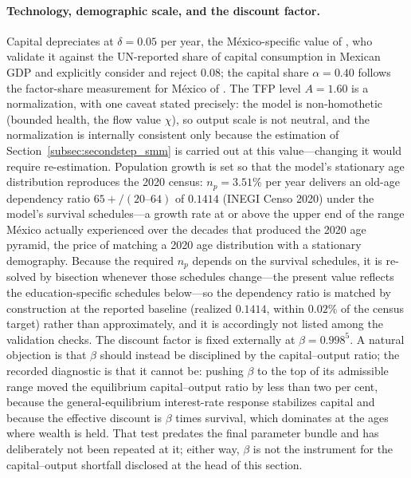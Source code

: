 \documentclass[12pt,a4paper]{article}
\begin{document}
\paragraph{Technology, demographic scale, and the discount factor.}
Capital depreciates at $\delta=0.05$ per year, the M\'exico-specific value of \citet{BergoeingKehoeKehoeSoto2002}, who validate it against the UN-reported share of capital consumption in Mexican GDP and explicitly consider and reject $0.08$; the capital share $\alpha=0.40$ follows the factor-share measurement for M\'exico of \citet{GarciaVerdu2005}. The TFP level $A=1.60$ is a normalization, with one caveat stated precisely: the model is non-homothetic (bounded health, the flow value $\chi$), so output scale is not neutral, and the normalization is internally consistent only because the estimation of Section~\ref{subsec:secondstep_smm} is carried out at this value---changing it would require re-estimation. Population growth is set so that the model's stationary age distribution reproduces the 2020 census: $n_p=3.51\%$ per year delivers an old-age dependency ratio $65{+}/(20\text{--}64)$ of $0.1414$ (INEGI Censo 2020) under the model's survival schedules---a growth rate at or above the upper end of the range M\'exico actually experienced over the decades that produced the 2020 age pyramid, the price of matching a 2020 age distribution with a stationary demography. Because the required $n_p$ depends on the survival schedules, it is re-solved by bisection whenever those schedules change---the present value reflects the education-specific schedules below---so the dependency ratio is matched by construction at the reported baseline (realized $0.1414$, within $0.02\%$ of the census target) rather than approximately, and it is accordingly not listed among the validation checks. The discount factor is fixed externally at $\beta=0.998^5$. A natural objection is that $\beta$ should instead be disciplined by the capital--output ratio; the recorded diagnostic is that it cannot be: pushing $\beta$ to the top of its admissible range moved the equilibrium capital--output ratio by less than two per cent, because the general-equilibrium interest-rate response stabilizes capital and because the effective discount is $\beta$ times survival, which dominates at the ages where wealth is held. That test predates the final parameter bundle and has deliberately not been repeated at it; either way, $\beta$ is not the instrument for the capital--output shortfall disclosed at the head of this section.
\end{document}
